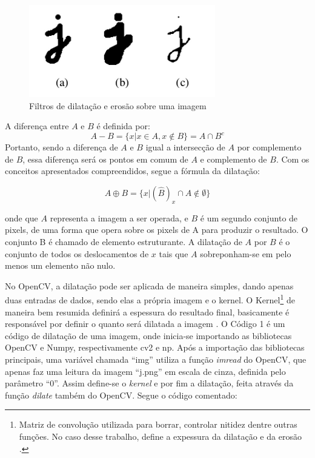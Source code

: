 \begin{figure}[htbp]
\caption{\label{fig:filtros2}Filtros de dilatação e erosão sobre uma imagem}
\begin{center}
\includegraphics[width=.5\textwidth]{figuras/f3c3.png}
\end{center}
\end{figure} 

A diferença entre $A$ e $B$ é definida por:
\[
A - B = \{x | x \in A,x \not \in B\} = A \cap B^c
\]
Portanto, sendo a diferença de $A$ e $B$ igual a intersecção de $A$ por complemento de $B$, essa diferença será os pontos em comum de $A$ e complemento de $B$. Com os conceitos apresentados compreendidos, segue a fórmula da dilatação:

\[A \oplus B = \{x|(\hat{B})_x \cap A \notin \emptyset\}\]

\noindent onde que $A$ representa a imagem a ser operada, e $B$ é um segundo conjunto de pixels, de uma forma que opera sobre os pixels de A para produzir o resultado. O conjunto B é chamado de elemento estruturante. A dilatação de $A$ por $B$ é o conjunto de todos os deslocamentos de $x$ tais que $A$ sobreponham-se em pelo menos um elemento não nulo.


No OpenCV, a dilatação pode ser aplicada de maneira simples, dando apenas duas entradas de dados, sendo elas a própria imagem e o kernel. O Kernel\footnote{Matriz de convolução utilizada para borrar, controlar nitidez dentre outras funções. No caso desse trabalho, define a expessura da dilatação e da erosão \cite{shapiro2001computer}.} de maneira bem resumida definirá a espessura do resultado final, basicamente é responsável por definir o quanto será dilatada a imagem \cite{opencv}. O Código 1 é um código de dilatação de uma imagem, onde inicia-se importando as bibliotecas OpenCV e Numpy, respectivamente cv2 e np. Após a importação das bibliotecas principais, uma variável chamada ``img'' utiliza a função \textit{imread} do OpenCV, que apenas faz uma leitura da imagem ``j.png'' em escala de cinza, definida pelo parâmetro ``0''. Assim define-se o \textit{kernel} e por fim a dilatação, feita através da função \textit{dilate} também do OpenCV. Segue o código comentado:

